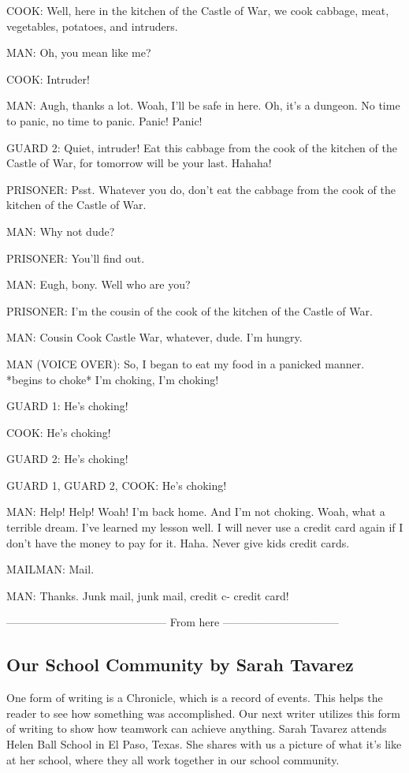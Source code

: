 COOK:
Well, here in the kitchen of the Castle of War, we cook cabbage, meat, vegetables, potatoes, and intruders.

MAN:
Oh, you mean like me?

COOK:
Intruder!

MAN:
Augh, thanks a lot.
Woah, I'll be safe in here.
Oh, it's a dungeon.
No time to panic, no time to panic.
Panic!
Panic!

GUARD 2:
Quiet, intruder!
Eat this cabbage from the cook of the kitchen of the Castle of War, for tomorrow will be your last.
Hahaha!

PRISONER:
Psst.
Whatever you do, don't eat the cabbage from the cook of the kitchen of the Castle of War.

MAN:
Why not dude?

PRISONER:
You'll find out.

MAN:
Eugh, bony.
Well who are you?

PRISONER:
I'm the cousin of the cook of the kitchen of the Castle of War.

MAN:
Cousin Cook Castle War, whatever, dude.
I'm hungry.

MAN (VOICE OVER):
So, I began to eat my food in a panicked manner.
*begins to choke*
I'm choking, I'm choking!

GUARD 1:
He's choking!

COOK:
He's choking!

GUARD 2:
He's choking!

GUARD 1, GUARD 2, COOK:
He's choking!

MAN:
Help!
Help!
Woah!
I'm back home.
And I'm not choking.
Woah, what a terrible dream.
I've learned my lesson well.
I will never use a credit card again if I don't have the money to pay for it.
Haha.
Never give kids credit cards.

MAILMAN:
Mail.

MAN:
Thanks.
Junk mail, junk mail, credit c- credit card!

-------------------------------------------- From here --------------------------------

\subsection{Our School Community by Sarah Tavarez}

One form of writing is a Chronicle, which is a record of events.
This helps the reader to see how something was accomplished.
Our next writer utilizes this form of writing to show how teamwork can achieve anything.
Sarah Tavarez attends Helen Ball School in El Paso, Texas.
She shares with us a picture of what it's like at her school, where they all work together in our school community.

